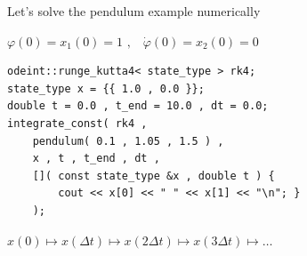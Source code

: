 \begin{frame}[fragile]
 \centerline{ \Large Let's solve the pendulum example numerically}

\vspace{2ex}
$\varphi(0) = x_1(0) = 1 \,\, \text{,} \quad \dot{\varphi}(0) = x_2(0) = 0$
\vspace{2ex}

\begin{lstlisting}
odeint::runge_kutta4< state_type > rk4;
state_type x = {{ 1.0 , 0.0 }};
double t = 0.0 , t_end = 10.0 , dt = 0.0;
integrate_const( rk4 ,
    pendulum( 0.1 , 1.05 , 1.5 ) ,
    x , t , t_end , dt ,
    []( const state_type &x , double t ) {
        cout << x[0] << " " << x[1] << "\n"; }
    );
\end{lstlisting}

\vspace{2ex}

\centerline{$x(0) \mapsto x(\Delta t) \mapsto x(2\Delta t) \mapsto x(3\Delta t) \mapsto \dots$}

\end{frame}



